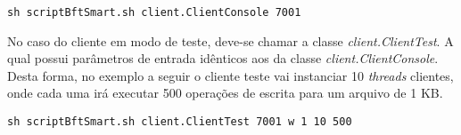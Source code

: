 \begin{lstlisting}
sh scriptBftSmart.sh client.ClientConsole 7001
\end{lstlisting}

No caso do cliente em modo de teste, deve-se chamar a classe \textit{client.ClientTest}. A qual possui parâmetros de entrada idênticos aos da classe \textit{client.ClientConsole}. Desta forma, no exemplo a seguir o cliente teste vai instanciar 10 \textit{threads} clientes, onde cada uma irá executar 500 operações de escrita para um arquivo de 1 KB.
\\

\begin{lstlisting}
sh scriptBftSmart.sh client.ClientTest 7001 w 1 10 500
\end{lstlisting}